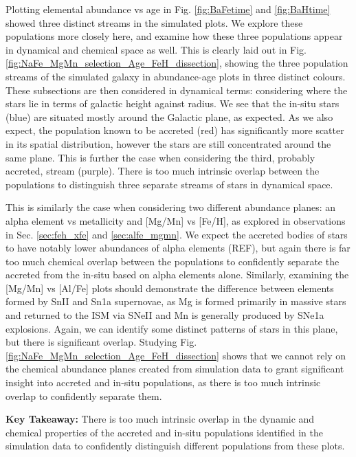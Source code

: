 \documentclass[fleqn,usenatbib]{mnras}
\begin{document}
Plotting elemental abundance vs age in Fig. \ref{fig:BaFetime} and \ref{fig:BaHtime} showed three distinct streams in the simulated plots. We explore these populations more closely here, and examine how these three populations appear in dynamical and chemical space as well. This is clearly laid out in Fig. \ref{fig:NaFe_MgMn_selection_Age_FeH_dissection}, showing the three population streams of the simulated galaxy in abundance-age plots in three distinct colours. These subsections are then considered in dynamical terms: considering where the stars lie in terms of galactic height against radius. We see that the in-situ stars (blue) are situated mostly around the Galactic plane, as expected. As we also expect, the population known to be accreted (red) has significantly more scatter in its spatial distribution, however the stars are still concentrated around the same plane. This is further the case when considering the third, probably accreted, stream (purple). There is too much intrinsic overlap between the populations to distinguish three separate streams of stars in dynamical space. \par 
This is similarly the case when considering two different abundance planes: an alpha element vs metallicity and [Mg/Mn] vs [Fe/H], as explored in observations in Sec. \ref{sec:feh_xfe} and \ref{sec:alfe_mgmn}. We expect the accreted bodies of stars to have notably lower abundances of alpha elements (REF), but again there is far too much chemical overlap between the populations to confidently separate the accreted from the in-situ based on alpha elements alone. Similarly, examining the [Mg/Mn] vs [Al/Fe] plots should demonstrate the difference between elements formed by SnII and Sn1a supernovae, as Mg is formed primarily in massive stars and returned to the ISM via SNeII \citep{Kobayashi2020} and Mn is generally produced by SNe1a explosions. Again, we can identify some distinct patterns of stars in this plane, but there is significant overlap. Studying Fig. \ref{fig:NaFe_MgMn_selection_Age_FeH_dissection} shows that we cannot rely on the chemical abundance planes created from simulation data to grant significant insight into accreted and in-situ populations, as there is too much intrinsic overlap to confidently separate them. \par 
\textbf{Key Takeaway:} There is too much intrinsic overlap in the dynamic and chemical properties of the accreted and in-situ populations identified in the simulation data to confidently distinguish different populations from these plots. 
\end{document}

